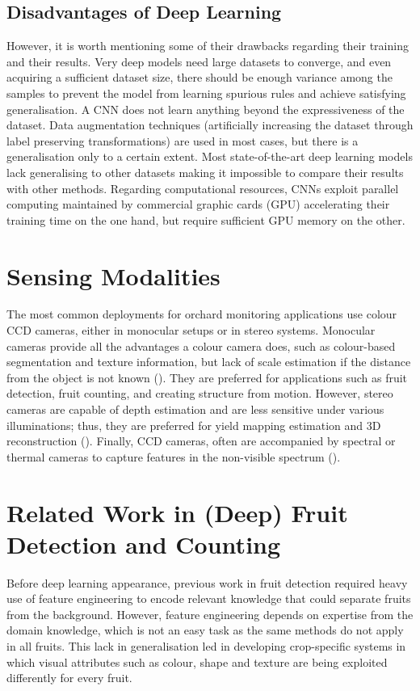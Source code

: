 \subsection{Disadvantages of Deep Learning}
However, it is worth mentioning some of their drawbacks regarding their training and their results. Very deep models need large datasets to converge, and even acquiring a sufficient dataset size, there should be enough variance among the samples to prevent the model from learning spurious rules and achieve satisfying generalisation. A CNN does not learn anything beyond the expressiveness of the dataset. Data augmentation techniques (artificially increasing the dataset through label preserving transformations) are used in most cases, but there is a generalisation only to a certain extent. Most state-of-the-art deep learning models lack generalising to other datasets making it impossible to compare their results with other methods. Regarding computational resources, CNNs exploit parallel computing maintained by commercial graphic cards (GPU) accelerating their training time on the one hand, but require sufficient GPU memory on the other.

\section{Sensing Modalities}
The most common deployments for orchard monitoring applications use colour CCD cameras, either in monocular setups or in stereo systems. Monocular cameras provide all the advantages a colour camera does, such as colour-based segmentation and texture information, but lack of scale estimation if the distance from the object is not known (\cite{gongal2015sensors}). They are preferred for applications such as fruit detection, fruit counting, and creating structure from motion. However, stereo cameras are capable of depth estimation and are less sensitive under various illuminations; thus, they are preferred for yield mapping estimation and 3D reconstruction (\cite{wang2016localisation}). Finally, CCD cameras, often are accompanied by spectral or thermal cameras to capture features in the non-visible spectrum (\cite{gongal2015sensors}).

\section{Related Work in (Deep) Fruit Detection and Counting}
Before deep learning appearance, previous work in fruit detection required heavy use of feature engineering to encode relevant knowledge that could separate fruits from the background. However, feature engineering depends on expertise from the domain knowledge, which is not an easy task as the same methods do not apply in all fruits. This lack in generalisation led in developing crop-specific systems in which visual attributes such as colour, shape and texture are being exploited differently for every fruit.

